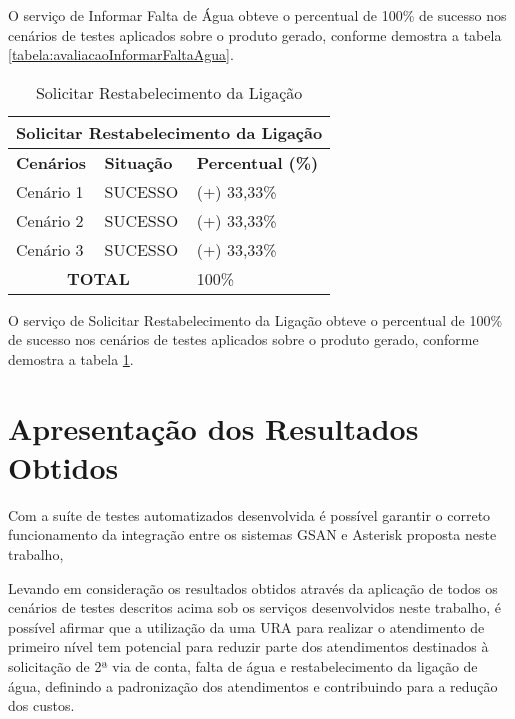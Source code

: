 O serviço de Informar Falta de Água obteve o percentual de 100\% de sucesso nos cenários de testes aplicados sobre o produto gerado, conforme demostra a tabela \ref{tabela:avaliacaoInformarFaltaAgua}.


\begin{table}[H]
	\center
	\footnotesize
	\caption{Solicitar Restabelecimento da Ligação}
	\label{tabela:avaliacaoRestabelerLigacaoAgua}
	\begin{tabular}{|p{3cm}|p{3cm}|p{3cm}|}
		\hline
		\multicolumn{3}{|c|}{\textbf{Solicitar Restabelecimento da Ligação}} \\
		\hline
		\textbf{Cenários}  	& \textbf{Situação} & \textbf{Percentual (\%)}  \\
		\hline		
		Cenário 1			& SUCESSO 		& (+) 33,33\% 	\\
		\hline
		Cenário 2 			& SUCESSO		& (+) 33,33\% 	\\
		\hline
		Cenário 3 			& SUCESSO 		& (+) 33,33\%	\\
		\hline		
		\multicolumn{2}{|c|}{\textbf{TOTAL}}	& 100\% 	\\
		\hline				
	\end{tabular}
\end{table}

O serviço de Solicitar Restabelecimento da Ligação obteve o percentual de 100\% de sucesso nos cenários de testes aplicados sobre o produto gerado, conforme demostra a tabela \ref{tabela:avaliacaoRestabelerLigacaoAgua}.


\section{Apresentação dos Resultados Obtidos}

Com a suíte de testes automatizados desenvolvida é possível garantir o correto funcionamento da integração entre os sistemas GSAN e Asterisk proposta neste trabalho, 

Levando em consideração os resultados obtidos através da aplicação de todos os cenários de testes descritos acima sob os serviços desenvolvidos neste trabalho, é possível afirmar que a utilização da uma URA para realizar o atendimento de primeiro nível tem potencial para reduzir parte dos atendimentos destinados à solicitação de 2ª via de conta, falta de água e restabelecimento da ligação de água, definindo a padronização dos atendimentos e contribuindo para a redução dos custos.
 


